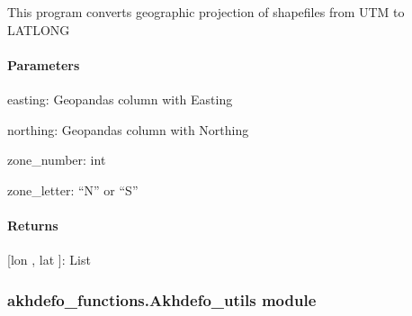 \documentclass[letterpaper,10pt,english]{sphinxmanual}
\begin{document}
\begin{fulllineitems}
\label{\detokenize{akhdefo_functions:akhdefo_functions.Akhdefo_Tools.utm_to_latlon}}
\pysigstartsignatures
{}
\pysigstopsignatures
\sphinxAtStartPar
This program converts geographic projection of shapefiles from UTM to LATLONG


\paragraph{Parameters}
\label{\detokenize{akhdefo_functions:id16}}
\sphinxAtStartPar
easting: Geopandas column with Easting

\sphinxAtStartPar
northing: Geopandas column with Northing

\sphinxAtStartPar
zone\_number: int

\sphinxAtStartPar
zone\_letter: “N” or “S”


\paragraph{Returns}
\label{\detokenize{akhdefo_functions:id17}}
\sphinxAtStartPar
{[}lon , lat {]}: List

\end{fulllineitems}



\subsubsection{akhdefo\_functions.Akhdefo\_utils module}
\label{\detokenize{akhdefo_functions:module-akhdefo_functions.Akhdefo_utils}}\label{\detokenize{akhdefo_functions:akhdefo-functions-akhdefo-utils-module}}
\end{document}
